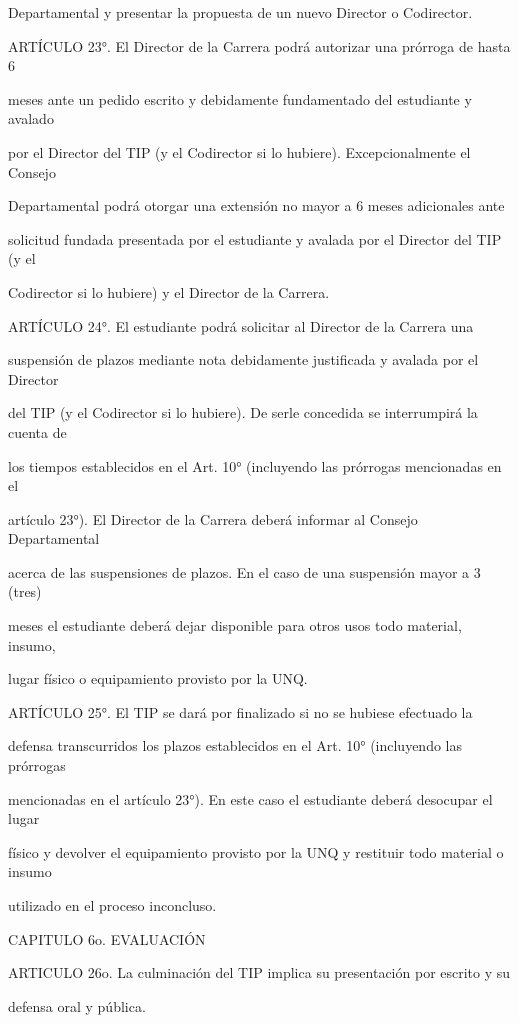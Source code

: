 \documentclass[a4paper,12pt]{article}
\begin{document}
Departamental y presentar la propuesta de un nuevo Director o Codirector. 

ARTÍCULO 23°. El Director de la Carrera podrá autorizar una prórroga de hasta 6

meses ante un pedido escrito y debidamente fundamentado del estudiante y avalado

por el Director del TIP (y el Codirector si lo hubiere). Excepcionalmente el Consejo

Departamental podrá otorgar una extensión no mayor a 6 meses adicionales ante

solicitud fundada presentada por el estudiante y avalada por el Director del TIP (y el

Codirector si lo hubiere) y el Director de la Carrera. 

ARTÍCULO 24°. El estudiante podrá solicitar al Director de la Carrera una

suspensión de plazos mediante nota debidamente justificada y avalada por el Director

del TIP (y el Codirector si lo hubiere). De serle concedida se interrumpirá la cuenta de

los tiempos establecidos en el Art. 10° (incluyendo las prórrogas mencionadas en el

artículo 23°). El Director de la Carrera deberá informar al Consejo Departamental

acerca de las suspensiones de plazos. En el caso de una suspensión mayor a 3 (tres)

meses el estudiante deberá dejar disponible para otros usos todo material, insumo,

lugar físico o equipamiento provisto por la UNQ.

ARTÍCULO 25°. El TIP se dará por finalizado si no se hubiese efectuado la

defensa transcurridos los plazos establecidos en el Art. 10° (incluyendo las prórrogas

mencionadas en el artículo 23°). En este caso el estudiante deberá desocupar el lugar

físico y devolver el equipamiento provisto por la UNQ y restituir todo material o insumo

utilizado en el proceso inconcluso.

CAPITULO 6o. EVALUACIÓN

ARTICULO 26o. La culminación del TIP implica su presentación por escrito y su

defensa oral y pública.
\end{document}
